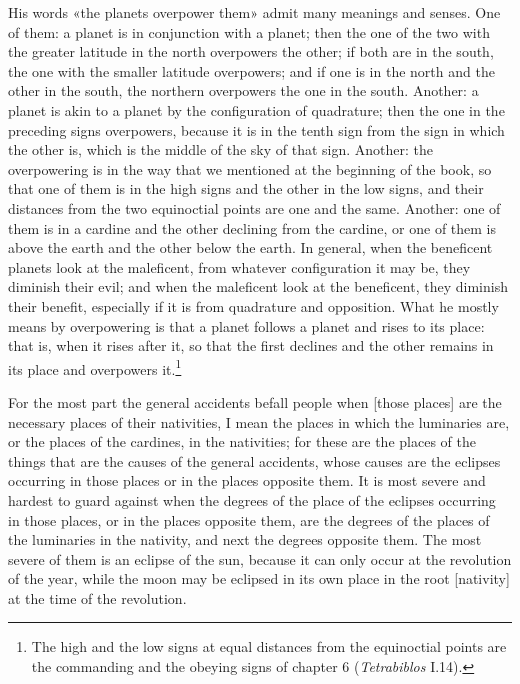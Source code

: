 \documentclass[11pt]{article}
\newcommand{\Fol}[1]{\marginpar{\footnotesize\color{gray}f.\,#1}}
\begin{document}
\par His words «the planets overpower them» admit many meanings and senses. One of them: a planet is in conjunction with a planet; then the one of the two with the greater latitude in the north overpowers the other; if both are in the south, the one with the smaller latitude overpowers; and if one is in the north and the other in the south, the northern overpowers the one in the south. Another: a planet is akin to a planet by the configuration of quadrature; then the one in the preceding signs overpowers, because it is in the tenth sign from the sign in which the other is, which is the middle of the sky of that sign. Another: the overpowering is in the way that we mentioned at the beginning of the book, so that one of them is in the high signs and the other in the low signs, and their distances from the two equinoctial points are one and the same. Another: one of them is in a cardine and the other declining from the cardine, or one of them is above the earth and the other below the earth. In general, when the beneficent planets look at the maleficent, from whatever configuration it may be, they diminish their evil; and when the maleficent look at the beneficent, they diminish their benefit, especially if it is from quadrature and opposition. What he mostly means by overpowering is that a planet follows a planet and rises to its place: that is, when it rises after it, so that the first declines and the other remains in its place and overpowers it.\footnote{The high and the low signs at equal distances from the equinoctial points are the commanding and the obeying signs of chapter 6 (\emph{Tetrabiblos} I.14).}\par
\par \Fol{30v}For the most part the general accidents befall people when [those places] are the necessary places of their nativities, I mean the places in which the luminaries are, or the places of the cardines, in the nativities; for these are the places of the things that are the causes of the general accidents, whose causes are the eclipses occurring in those places or in the places opposite them. It is most severe and hardest to guard against when the degrees of the place of the eclipses occurring in those places, or in the places opposite them, are the degrees of the places of the luminaries in the nativity, and next the degrees opposite them. The most severe of them is an eclipse of the sun, because it can only occur at the revolution of the year, while the moon may be eclipsed in its own place in the root [nativity] at the time of the revolution.\par
\end{document}
